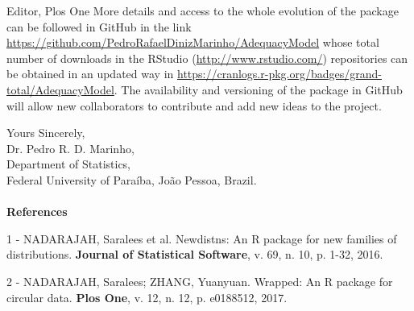 \documentclass[a4paper, 10pt]{letter}
\begin{document}
\begin{letter}{Editor, Plos One}
More details and access to the whole evolution of the package can be followed in GitHub in the link \url{https://github.com/PedroRafaelDinizMarinho/AdequacyModel} whose total number of downloads in the RStudio (\url{http://www.rstudio.com/}) repositories can be obtained in an updated way in \url{https://cranlogs.r-pkg.org/badges/grand-total/AdequacyModel}. The availability and versioning of the package in GitHub will allow new collaborators to contribute and add new ideas to the project.


Yours Sincerely,\\
Dr. Pedro R. D. Marinho,\\
Department of Statistics, \\
Federal University of Para\'{i}ba, Jo\~{a}o Pessoa, Brazil. \\
\vspace{0.5cm}\\
\Large{\bf References}

1 - NADARAJAH, Saralees et al. Newdistns: An R package for new families of distributions. \textbf{Journal of Statistical Software}, v. 69, n. 10, p. 1-32, 2016.

2 - NADARAJAH, Saralees; ZHANG, Yuanyuan. Wrapped: An R package for circular data. \textbf{Plos One}, v. 12, n. 12, p. e0188512, 2017.
\end{letter}
\end{document}
